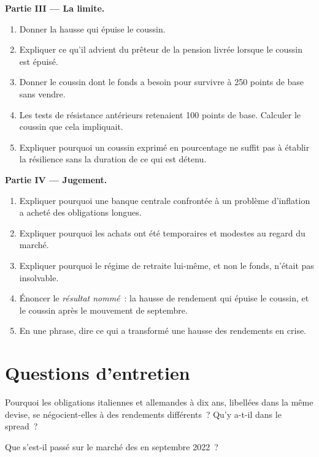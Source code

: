 \begin{problem}
\medskip\noindent\textbf{Partie III --- La limite.}
\begin{enumerate}[resume]
\item Donner la hausse qui épuise le coussin.
\item Expliquer ce qu'il advient du prêteur de la pension livrée lorsque le coussin est épuisé.
\item Donner le coussin dont le fonds a besoin pour survivre à 250 points de base sans
vendre.
\item Les tests de résistance antérieurs retenaient 100 points de base. Calculer le coussin que cela impliquait.
\item Expliquer pourquoi un coussin exprimé en pourcentage ne suffit pas à établir la résilience sans
la duration de ce qui est détenu.
\end{enumerate}

\medskip\noindent\textbf{Partie IV --- Jugement.}
\begin{enumerate}[resume]
\item Expliquer pourquoi une banque centrale confrontée à un problème d'inflation a acheté des obligations longues.
\item Expliquer pourquoi les achats ont été temporaires et modestes au regard du marché.
\item Expliquer pourquoi le régime de retraite lui-même, et non le fonds, n'était pas insolvable.
\item Énoncer le \emph{résultat nommé}~: la hausse de rendement qui épuise le coussin,
et le coussin après le mouvement de septembre.
\item En une phrase, dire ce qui a transformé une hausse des rendements en crise.
\end{enumerate}
\end{problem}

\section{Questions d'entretien}

\begin{interviewq}\label{iq:m2:european-and-japanese-government-bonds:1}
Pourquoi les obligations italiennes et allemandes à dix ans, libellées dans la même devise,
se négocient-elles à des rendements différents~? Qu'y a-t-il dans le spread~?
\end{interviewq}

\begin{interviewq}\label{iq:m2:european-and-japanese-government-bonds:2}
Que s'est-il passé sur le marché des  en septembre 2022~?
\end{interviewq}

